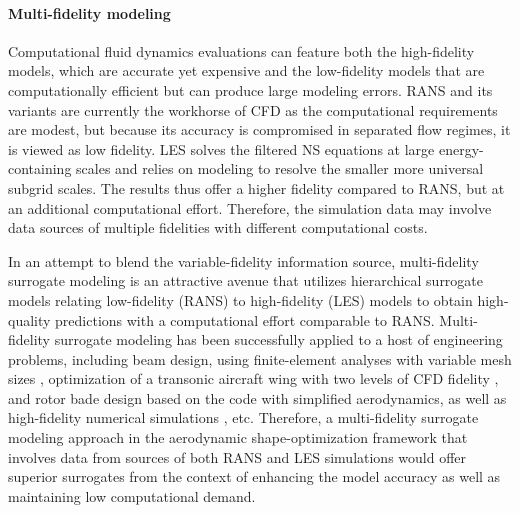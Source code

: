 \paragraph{Multi-fidelity modeling} Computational fluid dynamics evaluations can feature both the high-fidelity models, which are accurate yet expensive and the low-fidelity models that are computationally efficient but can produce large modeling errors. RANS and its variants are currently the workhorse of CFD \citep{kareem2017computational} as the computational requirements are modest, but because its accuracy is compromised in separated flow regimes, it is viewed as low fidelity. LES solves the filtered NS equations at large energy-containing scales and relies on modeling to resolve the smaller more universal subgrid scales. The results thus offer a higher fidelity compared to RANS, but at an additional computational effort. Therefore, the simulation data may involve data sources of multiple fidelities with different computational costs.

In an attempt to blend the variable-fidelity information source, multi-fidelity surrogate modeling is an attractive avenue that utilizes hierarchical surrogate models relating low-fidelity (RANS) to high-fidelity (LES) models to obtain high-quality predictions with a computational effort comparable to RANS. Multi-fidelity surrogate modeling has been successfully applied to a host of engineering problems, including beam design, using finite-element analyses with variable mesh sizes \citep{leary2003knowledgebased}, optimization of a transonic aircraft wing with two levels of CFD fidelity \citep{forrester2007multifidelity}, and rotor bade design based on the code with simplified aerodynamics, as well as high-fidelity numerical simulations \citep{collins2008multifidelity}, etc. Therefore, a multi-fidelity surrogate modeling approach in the aerodynamic shape-optimization framework that involves data from sources of both RANS and LES simulations would offer superior surrogates from the context of enhancing the model accuracy as well as maintaining low computational demand.

